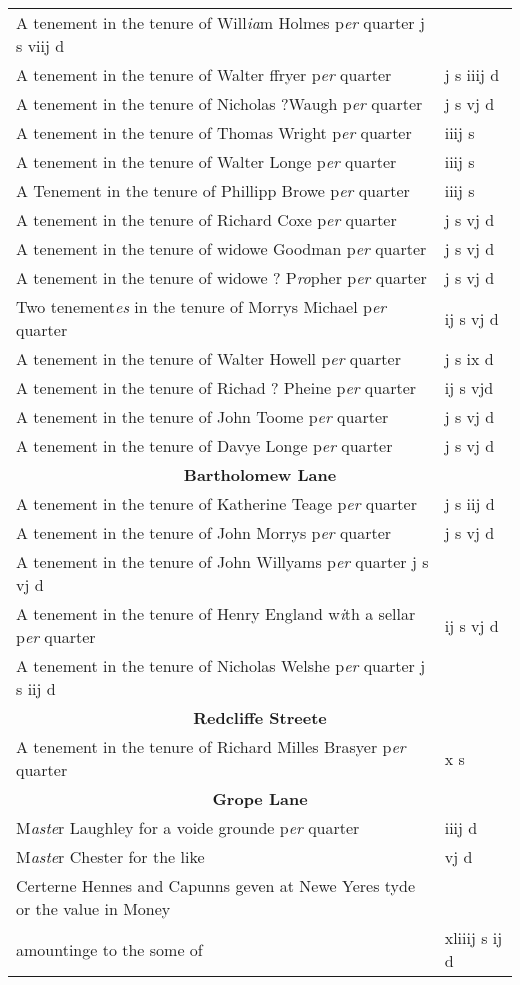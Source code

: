 \documentclass[a4paper,12pt]{article}
\begin{document}
\begin{landscape}
\begin{longtable}{l l}
A tenement in the tenure of Will\textit{ia}m Holmes p\textit{er} quarter j s viij d \\[0.15cm]
A tenement in the tenure of Walter ffryer p\textit{er} quarter & j s iiij d \\[0.15cm]
A tenement in the tenure of Nicholas ?Waugh p\textit{er} quarter & j s vj d \\[0.15cm]
A tenement in the tenure of Thomas Wright p\textit{er} quarter & iiij s \\[0.15cm]
A tenement in the tenure of Walter Longe p\textit{er} quarter & iiij s \\[0.15cm]
A Tenement in the tenure of Phillipp Browe p\textit{er} quarter & iiij s \\[0.15cm]
A tenement in the tenure of Richard Coxe p\textit{er} quarter & j s vj d \\[0.15cm]
A tenement in the tenure of widowe Goodman p\textit{er} quarter & j s vj d \\[0.15cm]
A tenement in the tenure of widowe ? P\textit{ro}pher p\textit{er} quarter & j s vj d \\[0.15cm]
Two tenement\textit{es} in the tenure of Morrys Michael p\textit{er} quarter & ij s vj d \\[0.15cm]
A tenement in the tenure of Walter Howell p\textit{er} quarter & j s ix d \\[0.15cm]
A tenement in the tenure of Richad ? Pheine p\textit{er} quarter & ij s vjd \\[0.15cm]
A tenement in the tenure of John Toome p\textit{er} quarter & j s vj d \\[0.15cm]
A tenement in the tenure of Davye Longe p\textit{er} quarter & j s vj d \\[0.25cm]
\multicolumn{2}{c}{\textbf{Bartholomew Lane}} \\[0.15cm]
A tenement in the tenure of Katherine Teage p\textit{er} quarter & j s iij d \\[0.15cm]
A tenement in the tenure of John Morrys p\textit{er} quarter & j s vj d \\[0.15cm]
A tenement in the tenure of John Willyams p\textit{er} quarter j s vj d \\[0.15cm]
A tenement in the tenure of Henry England w\textit{i}th a sellar p\textit{er} quarter & ij s vj d \\[0.15cm]
A tenement in the tenure of Nicholas Welshe p\textit{er} quarter j s iij d \\[0.25cm]
\multicolumn{2}{c}{\textbf{Redcliffe Streete}} \\[0.15cm]
A tenement in the tenure of Richard Milles Brasyer p\textit{er} quarter & x s \\[0.25cm]
\multicolumn{2}{c}{\textbf{Grope Lane}} \\[0.15cm]
M\textit{aste}r Laughley for a voide grounde p\textit{er} quarter & iiij d \\[0.15cm]
M\textit{aste}r Chester for the like & vj d \\[0.4cm]
Certerne Hennes and Capunns geven at Newe Yeres tyde or the value in Money & \\[0.15cm]
amountinge to the some of & xliiij s ij d
\end{longtable}

\end{landscape}
\end{document}
